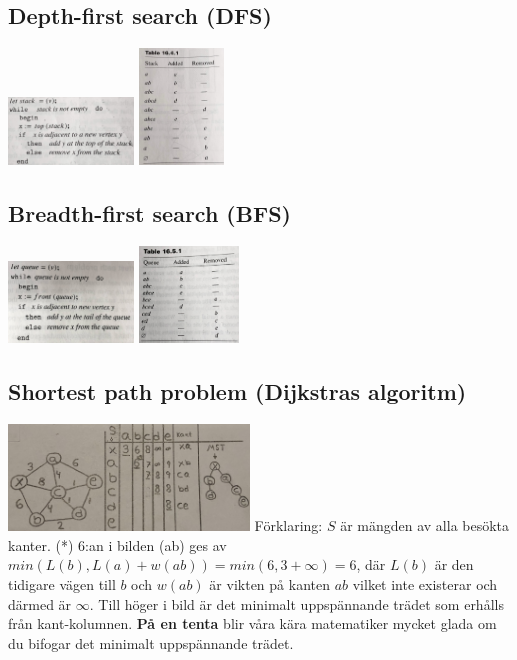 \documentclass{article}
\begin{document}
\begin{multicols}{2}
\subsection{Depth-first search (DFS)}
\includegraphics[width=0.25\textwidth]{images/DFS_alg}
\includegraphics[width=0.17\textwidth]{images/DFS_dia}


\subsection{Breadth-first search (BFS)}
\includegraphics[width=0.25\textwidth]{images/BFS_alg}
\includegraphics[width=0.2\textwidth]{images/BFS_dia}

\subsection{Shortest path problem (Dijkstras algoritm)}
\includegraphics[width=0.48\textwidth]{images/kortast}
Förklaring: $S$ är mängden av alla besökta kanter. (*) 6:an i bilden (ab) ges av $min(L(b),L(a)+w(ab))=min(6,3+\infty)=6$, där $L(b)$ är den tidigare vägen till $b$ och $w(ab)$ är vikten på kanten $ab$ vilket inte existerar och därmed är $\infty$. Till höger i bild är det minimalt uppspännande trädet som erhålls från kant-kolumnen. \textbf{På en tenta} blir våra kära matematiker mycket glada om du bifogar det minimalt uppspännande trädet.

\end{multicols}
\end{document}
